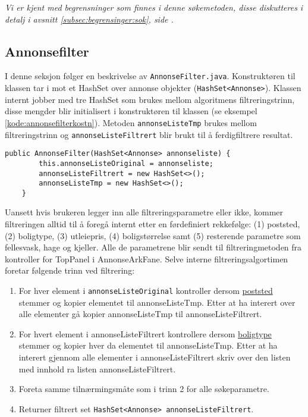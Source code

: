 \emph{Vi er kjent med begrensninger som finnes i denne søkemetoden, disse diskutteres i detalj i avsnitt \ref{subsec:begrensinger:sok}, side \pageref{subsec:begrensinger:sok}.}

\subsection{Annonsefilter} \label{sec:annonsesok}
I denne seksjon følger en beskrivelse av \texttt{AnnonseFilter.java}. Konstruktøren til klassen tar i mot et HashSet over annonse objekter (\texttt{HashSet<Annonse>}). Klassen internt jobber med tre HashSet som brukes mellom algoritmens filtreringstrinn, disse mengder blir initialisert i konstruktøren til klassen (se eksempel \ref{kode:annonsefilterkostn}). Metoden \texttt{annonseListeTmp} brukes mellom filtreringstrinn og \texttt{annonseListeFiltrert} blir brukt til å ferdigfiltrere resultat.

\begin{lstlisting}[caption=AnnonseFilter.java: Konstruktør, label=kode:annonsefilterkostn]
    public AnnonseFilter(HashSet<Annonse> annonseliste) {
        this.annonseListeOriginal = annonseliste;
        annonseListeFiltrert = new HashSet<>();
        annonseListeTmp = new HashSet<>();
    }
\end{lstlisting}

Uansett hvis brukeren legger inn alle filtreringsparametre eller ikke, kommer filtreringen alltid til å foregå internt etter en førdefiniert rekkefølge: (1) poststed, (2) boligtype, (3) utleiepris, (4) boligstørrelse samt (5) resterende parametre som fellesvask, hage og kjeller. 
Alle de parametrene blir sendt til filtreringmetoden fra kontroller for TopPanel i AnnonseArkFane. 
Selve interne filtreringsalgortimen foretar følgende trinn ved filtrering:
\begin{enumerate}
\item For hver element i \texttt{annonseListeOriginal} kontroller dersom \underline{poststed} stemmer og kopier elementet til annonseListeTmp. Etter at ha interert over alle elementer gå kopier annonseListeTmp til annonseListeFiltrert. 
\item For hvert element i annonseListeFiltrert kontrollere dersom \underline{boligtype} stemmer og kopier hver da elementet til annonseListeTmp. Etter at ha interert gjennom alle elementer i annonseListeFiltrert skriv over den listen med innhold ra listen annonseListeFiltrert. 
\item Foreta samme tilnærmingsmåte som i trinn 2 for alle søkeparametre. 
\item Returner filtrert set \texttt{HashSet<Annonse> annonseListeFiltrert}.
\end{enumerate}

